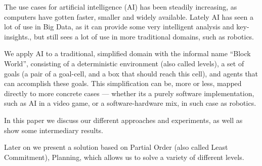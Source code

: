 \documentclass[Main]{subfiles}
\begin{document}
The use cases for artificial intelligence (AI) has been steadily increasing, as computers have gotten faster, smaller and widely available.
Lately AI has seen a lot of use in Big Data, as it can provide some very intelligent analysis and key-insights.\cite{OLeary2013},
but still sees a lot of use in more traditional domains, such as robotics.

We apply AI to a traditional, simplified domain with the informal name ``Block World'', consisting of a deterministic environment (also called levels), a set of goals (a pair of a goal-cell, and a box that should reach this cell), and agents that can accomplish these goals.
This simplification can be, more or less, mapped directly to more concrete cases --- 
whether its a purely software implementation, such as AI in a video game, or a software-hardware mix, in such case as robotics.

In this paper we discuss our different approaches and experiments, as well as show some intermediary results.

Later on we present a solution based on Partial Order (also called Least Commitment), Planning, 
which allows us to solve a variety of different levels. 
\end{document}
